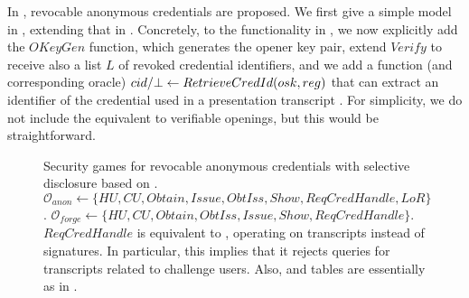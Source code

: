 In \cite{cks10}, revocable anonymous credentials are proposed. We first give a
simple model in , extending that in
. Concretely, to the functionality in
, we now explicitly add the $OKeyGen$ function,
which generates the opener key pair, extend $Verify$ to receive also a list $L$
of revoked credential identifiers, and we add a function (and corresponding
oracle) $cid/\bot \gets RetrieveCredId(osk,reg)$ that can extract an
identifier of the credential used in a presentation transcript \utrans. For
simplicity, we do not include the equivalent to verifiable openings, but this
would be straightforward.

\begin{figure}[ht!]
  \centering
  \caption{Security games for revocable anonymous credentials with selective
    disclosure based on \cite{fhs19}. 
    $\mathcal{O}_{anon} \gets \lbrace HU,CU,Obtain,Issue,ObtIss,Show,
    ReqCredHandle,LoR\rbrace$. $\mathcal{O}_{forge} \gets \lbrace HU,CU,
    Obtain,ObtIss,Issue,Show,ReqCredHandle \rbrace$. $ReqCredHandle$ is
    equivalent to \OPEN, operating on transcripts \utrans instead of signatures.
    In particular, this implies that it rejects queries for transcripts related
    to challenge users. Also, \OWNR and \ATTR tables are essentially as in
    .}
  \label{fig:model-rac}  
\end{figure}

